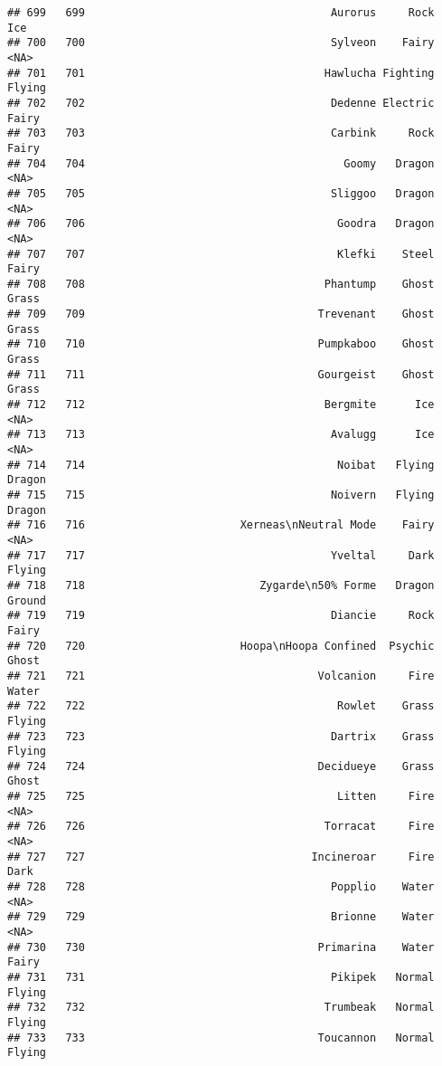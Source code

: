 \documentclass[
]{article}
\begin{document}
\begin{verbatim}
## 699   699                                      Aurorus     Rock      Ice
## 700   700                                      Sylveon    Fairy     <NA>
## 701   701                                     Hawlucha Fighting   Flying
## 702   702                                      Dedenne Electric    Fairy
## 703   703                                      Carbink     Rock    Fairy
## 704   704                                        Goomy   Dragon     <NA>
## 705   705                                      Sliggoo   Dragon     <NA>
## 706   706                                       Goodra   Dragon     <NA>
## 707   707                                       Klefki    Steel    Fairy
## 708   708                                     Phantump    Ghost    Grass
## 709   709                                    Trevenant    Ghost    Grass
## 710   710                                    Pumpkaboo    Ghost    Grass
## 711   711                                    Gourgeist    Ghost    Grass
## 712   712                                     Bergmite      Ice     <NA>
## 713   713                                      Avalugg      Ice     <NA>
## 714   714                                       Noibat   Flying   Dragon
## 715   715                                      Noivern   Flying   Dragon
## 716   716                        Xerneas\nNeutral Mode    Fairy     <NA>
## 717   717                                      Yveltal     Dark   Flying
## 718   718                           Zygarde\n50% Forme   Dragon   Ground
## 719   719                                      Diancie     Rock    Fairy
## 720   720                        Hoopa\nHoopa Confined  Psychic    Ghost
## 721   721                                    Volcanion     Fire    Water
## 722   722                                       Rowlet    Grass   Flying
## 723   723                                      Dartrix    Grass   Flying
## 724   724                                    Decidueye    Grass    Ghost
## 725   725                                       Litten     Fire     <NA>
## 726   726                                     Torracat     Fire     <NA>
## 727   727                                   Incineroar     Fire     Dark
## 728   728                                      Popplio    Water     <NA>
## 729   729                                      Brionne    Water     <NA>
## 730   730                                    Primarina    Water    Fairy
## 731   731                                      Pikipek   Normal   Flying
## 732   732                                     Trumbeak   Normal   Flying
## 733   733                                    Toucannon   Normal   Flying

\end{verbatim}
\end{document}
